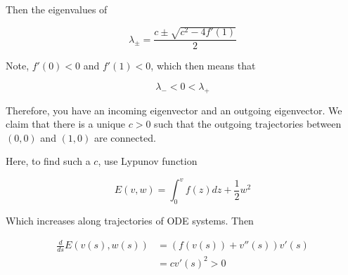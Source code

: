 \documentclass{article}
\newtheorem{one minute paper}[theorem]{One Minute Paper}
\begin{document}
Then the eigenvalues of 

\begin{equation}
    \lambda_{\pm} = \frac{c \pm \sqrt{c^2 - 4f'(1)}}{2}
\end{equation}

Note, $f'(0) < 0$ and $f'(1) < 0$, which then means that 

\begin{equation}
    \lambda_{-} < 0 < \lambda_{+}
\end{equation}

Therefore, you have an incoming eigenvector and an outgoing eigenvector. We claim that there is a unique $c >0$ such that the outgoing trajectories between $(0,0)$ and $(1,0)$ are connected. 

Here, to find such a $c$, use Lypunov function 

\begin{equation}
    E(v,w) = \int_{0}^vf(z)dz + \frac{1}{2}w^2
\end{equation}

Which increases along trajectories of ODE systems. Then 

\begin{align}
    \frac{d}{ds}E(v(s), w(s)) &= (f(v(s)) + v''(s))v'(s) \\
    &= cv'(s)^2 > 0
\end{align}
\end{document}
